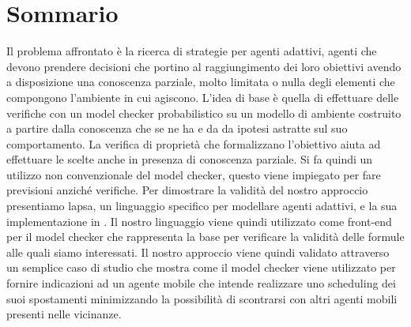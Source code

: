 \renewcommand{\abstractname}{Sommario}
\begingroup
\let\clearpage\relax
\let\cleardoublepage\relax
\let\cleardoublepage\relax

\chapter*{Sommario}
Il problema affrontato è la ricerca di strategie per agenti adattivi, agenti che devono prendere decisioni che portino al raggiungimento dei loro obiettivi avendo a disposizione una conoscenza parziale, molto limitata o nulla degli elementi che compongono l'ambiente in cui agiscono. L'idea di base è quella di effettuare delle verifiche con un model checker probabilistico su un modello di ambiente costruito a partire dalla conoscenza che se ne ha e da da ipotesi  astratte sul suo comportamento. La verifica di propriet\`a che formalizzano l'obiettivo aiuta ad effettuare le scelte anche in presenza di conoscenza parziale. Si fa quindi un utilizzo non convenzionale del model checker, questo viene impiegato per fare previsioni anzich\'e verifiche. Per dimostrare la validit\`a del nostro approccio presentiamo \acs{lapsa}, un linguaggio specifico per modellare agenti adattivi, e la sua implementazione in \xtext{}. Il nostro linguaggio viene quindi utilizzato come front-end per il model checker \prism{} che rappresenta la base per verificare la validit\`a delle formule alle quali siamo interessati. Il nostro approccio viene quindi validato attraverso un semplice caso di studio che mostra come il model checker viene utilizzato per fornire indicazioni ad un agente mobile che intende realizzare uno scheduling dei suoi spostamenti minimizzando la possibilit\`a di scontrarsi con altri agenti mobili presenti nelle vicinanze.
\endgroup			

\vfill